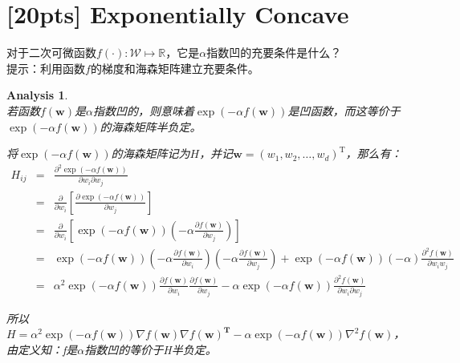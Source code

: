 \documentclass[a4paper,UTF8]{article}
\numberwithin{equation}{section}
\newtheorem*{myAnalysis}{Analysis}
\begin{document}
\newpage
\section{[20pts] Exponentially Concave}
\noindent 对于二次可微函数$f(\cdot):\mathcal{W} \mapsto \mathbb{R}$，它是$\alpha$指数凹的充要条件是什么？\\
提示：利用函数$f$的梯度和海森矩阵建立充要条件。
\begin{myAnalysis}~\\
	
若函数$f(\mathbf{w})$是$\alpha$指数凹的，则意味着$\exp(-\alpha f(\mathbf{w}))$是凹函数，而这等价于$\exp(-\alpha f(\mathbf{w}))$的海森矩阵半负定。

将$\exp(-\alpha f(\mathbf{w}))$的海森矩阵记为$H$，并记$\mathbf{w} = (w_1, w_2, \ldots, w_d)^\mathrm{T}$，那么有：
\begin{eqnarray*}
H_{ij} &=& \frac{\partial^2 \exp(-\alpha f(\mathbf{w}))} { \partial w_i \partial w_j } \\
&=& \frac{\partial}{\partial w_i} \left[ \frac{\partial \exp(-\alpha f(\mathbf{w}))} { \partial w_j } \right] \\
&=& \frac{\partial}{\partial w_i} \left[ \exp(-\alpha f(\mathbf{w})) (-\alpha \frac{\partial f(\mathbf{w})}{\partial w_j}) \right] \\
&=& \exp(-\alpha f(\mathbf{w})) (-\alpha \frac{\partial f(\mathbf{w})}{\partial w_i}) (-\alpha \frac{\partial f(\mathbf{w})}{\partial w_j}) + \exp(-\alpha f(\mathbf{w})) (-\alpha) \frac{\partial^2f(\mathbf{w})}{\partial w_i w_j} \\
&=& \alpha^2 \exp(-\alpha f(\mathbf{w})) \frac{\partial f(\mathbf{w})}{\partial w_i} \frac{\partial f(\mathbf{w})}{\partial w_j} - \alpha \exp(-\alpha f(\mathbf{w})) \frac{\partial^2 f(\mathbf{w})}{\partial w_i \partial w_j}
\end{eqnarray*}

所以$H = \alpha^2 \exp(-\alpha f(\mathbf{w})) \nabla f(\mathbf{w}) \nabla f(\mathbf{w}) ^ \mathbf{T} - \alpha \exp(-\alpha f(\mathbf{w})) \nabla^2 f(\mathbf{w})$，由定义知：f是$\alpha$指数凹的等价于H半负定。

	~\\	
	~\\
\end{myAnalysis}

\newpage
\end{document}
